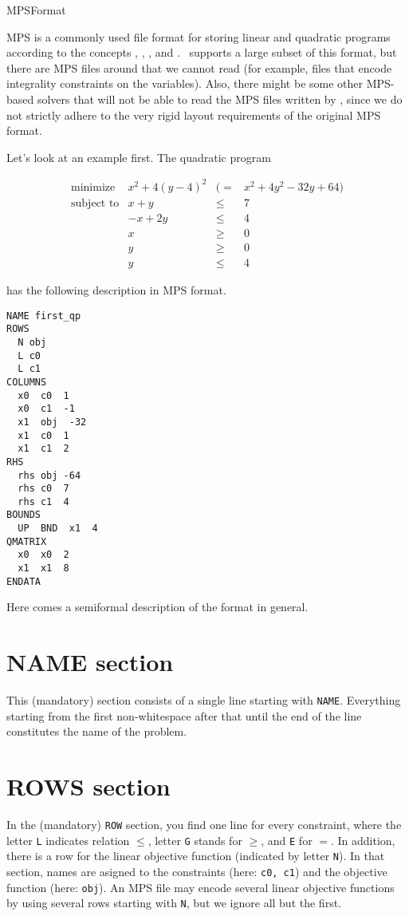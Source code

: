 \begin{ccRefConcept}{MPSFormat}

MPS is a commonly used file format for storing linear and quadratic 
programs according to the concepts ,
,
, and
. \cgal\ supports a large subset of
this format, but there are MPS files around that we cannot read (for
example, files that encode integrality constraints on the variables).
Also, there might be some other MPS-based solvers that will not be able 
to read the MPS files written by \cgal, since we do not strictly
adhere to the very rigid layout requirements of the original MPS 
format.

Let's look at an example first. The quadratic program 

\[
\begin{array}{lrcl}
\mbox{minimize}       & x^2 + 4(y-4)^2 &(=& x^2 + 4y^2 - 32y + 64) \\
\mbox{subject to}     & x + y &\leq& 7 \\
                      & -x + 2y &\leq& 4 \\
                      & x &\geq& 0 \\
                      & y &\geq& 0 \\
                      & y &\leq& 4
\end{array}
\]

has the following description in MPS format. 

\begin{verbatim}
NAME first_qp
ROWS
  N obj
  L c0
  L c1
COLUMNS
  x0  c0  1
  x0  c1  -1
  x1  obj  -32
  x1  c0  1
  x1  c1  2
RHS
  rhs obj -64
  rhs c0  7
  rhs c1  4
BOUNDS
  UP  BND  x1  4
QMATRIX
  x0  x0  2
  x1  x1  8
ENDATA
\end{verbatim}

Here comes a semiformal description of the format in general.

\section*{NAME section}
This (mandatory) section consists of a single line
starting with \texttt{NAME}. Everything starting from the
first non-whitespace after that until the end of the line
constitutes the name of the problem.

\section*{ROWS section}
In the (mandatory) \texttt{ROW} section, you find one line for every
constraint, where the letter \texttt{L} indicates relation $\leq$,
letter \texttt{G} stands for $\geq$, and \texttt{E} for $=$. In
addition, there is a row for the linear objective function (indicated
by letter \texttt{N}). In that section, names are asigned to the
constraints (here: \texttt{c0, c1}) and the objective function (here:
\texttt{obj}).  An MPS file may encode several linear objective
functions by using several rows starting with \texttt{N}, but we ignore
all but the first.


\end{ccRefConcept}
